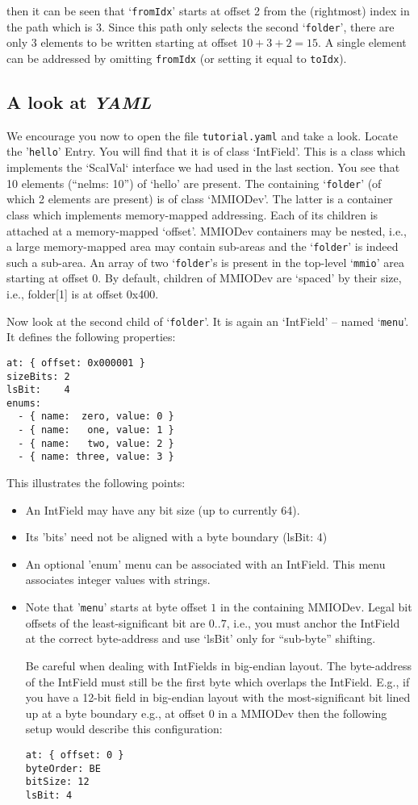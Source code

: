 \documentclass[10pt]{article}
\newcommand{\ita}[1]{\emph{#1}}
\newcommand{\yaml}      {\ita {YAML}}
\newcommand{\entry}     {{Entry}}
\newcommand{\cod}[1] {{\tt#1}}
\newcommand{\tutyaml} {\cod{tutorial.yaml}}
\begin{document}
then it can be seen that `\cod{fromIdx}' starts at offset 2 from the (rightmost)
index in the path which is 3. Since this path only selects the second
`\cod{folder}', there are only 3 elements to be written starting at offset
$10+3+2=15$. A single element can be addressed by omitting \cod{fromIdx}
(or setting it equal to \cod{toIdx}).

\subsection{A look at \yaml{}}
We encourage you now to open the file \tutyaml{} and take a look.
Locate the '\cod{hello}' \entry{}. You will find that it is of class `IntField'.
This is a class which implements the `ScalVal` interface we had used in the
last section. You see that 10 elements (``nelms: 10'') of `hello' are present.
The containing `\cod{folder}' (of which 2 elements are present) is of class `MMIODev'.
The latter is a container class which implements memory-mapped addressing. Each of
its children is attached at a memory-mapped `offset'. MMIODev containers
may be nested, i.e., a large memory-mapped area may contain sub-areas and
the `\cod{folder}' is indeed such a sub-area. An array of two `\cod{folder}'s is
present in the top-level `\cod{mmio}' area starting at offset 0.
By default, children of MMIODev are `spaced' by their size, i.e., folder[1] is
at offset 0x400.

Now look at the second child of `\cod{folder}'. It is again an `IntField' -- named
`\cod{menu}'.  It defines the following properties:
\begin{verbatim}
at: { offset: 0x000001 }
sizeBits: 2
lsBit:    4
enums:
  - { name:  zero, value: 0 }
  - { name:   one, value: 1 }
  - { name:   two, value: 2 }
  - { name: three, value: 3 }
\end{verbatim}
This illustrates the following points:
\begin{itemize}
\item An IntField may have any bit size (up to currently 64).
\item Its 'bits' need not be aligned with a byte boundary (lsBit: 4)
\item An optional 'enum' menu can be associated with an IntField. This
      menu associates integer values with strings.
\item Note that '\cod{menu}' starts at byte offset $1$ in the containing MMIODev.
      Legal bit offsets of the least-significant bit are $0..7$, i.e., you
      must anchor the IntField at the correct byte-address and use `lsBit'
      only for ``sub-byte'' shifting.

      Be careful when dealing with IntFields in big-endian layout. The byte-address
      of the IntField must still be the first byte which overlaps the IntField. E.g.,
      if you have a 12-bit field in big-endian layout with the most-significant
      bit lined up at a byte boundary e.g., at offset $0$ in a MMIODev then the
      following setup would describe this configuration:
\begin{verbatim}
at: { offset: 0 }
byteOrder: BE
bitSize: 12
lsBit: 4
\end{verbatim}
\end{itemize}
\end{document}
